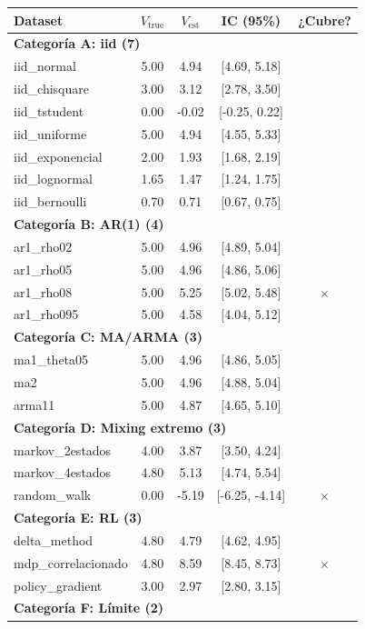 \documentclass[12pt,a4paper]{article}
\newcommand{\ok}{\textcolor{cbgreen}{\checkmark}}
\newcommand{\fail}{\textcolor{cbred}{$\times$}}
\begin{document}
\begin{longtable}{@{}lcccc@{}}
\toprule
Dataset & $V_{\text{true}}$ & $V_{\text{est}}$ & IC (95\%) & ¿Cubre? \\
\midrule
\endhead
\multicolumn{5}{l}{\textbf{Categoría A: iid (7)}} \\
iid\_normal & 5.00 & 4.94 & [4.69, 5.18] & \ok \\
iid\_chisquare & 3.00 & 3.12 & [2.78, 3.50] & \ok \\
iid\_tstudent & 0.00 & -0.02 & [-0.25, 0.22] & \ok \\
iid\_uniforme & 5.00 & 4.94 & [4.55, 5.33] & \ok \\
iid\_exponencial & 2.00 & 1.93 & [1.68, 2.19] & \ok \\
iid\_lognormal & 1.65 & 1.47 & [1.24, 1.75] & \ok \\
iid\_bernoulli & 0.70 & 0.71 & [0.67, 0.75] & \ok \\
\midrule
\multicolumn{5}{l}{\textbf{Categoría B: AR(1) (4)}} \\
ar1\_rho02 & 5.00 & 4.96 & [4.89, 5.04] & \ok \\
ar1\_rho05 & 5.00 & 4.96 & [4.86, 5.06] & \ok \\
ar1\_rho08 & 5.00 & 5.25 & [5.02, 5.48] & \fail \\
ar1\_rho095 & 5.00 & 4.58 & [4.04, 5.12] & \ok \\
\midrule
\multicolumn{5}{l}{\textbf{Categoría C: MA/ARMA (3)}} \\
ma1\_theta05 & 5.00 & 4.96 & [4.86, 5.05] & \ok \\
ma2 & 5.00 & 4.96 & [4.88, 5.04] & \ok \\
arma11 & 5.00 & 4.87 & [4.65, 5.10] & \ok \\
\midrule
\multicolumn{5}{l}{\textbf{Categoría D: Mixing extremo (3)}} \\
markov\_2estados & 4.00 & 3.87 & [3.50, 4.24] & \ok \\
markov\_4estados & 4.80 & 5.13 & [4.74, 5.54] & \ok \\
random\_walk & 0.00 & -5.19 & [-6.25, -4.14] & \fail \\
\midrule
\multicolumn{5}{l}{\textbf{Categoría E: RL (3)}} \\
delta\_method & 4.80 & 4.79 & [4.62, 4.95] & \ok \\
mdp\_correlacionado & 4.80 & 8.59 & [8.45, 8.73] & \fail \\
policy\_gradient & 3.00 & 2.97 & [2.80, 3.15] & \ok \\
\midrule
\multicolumn{5}{l}{\textbf{Categoría F: Límite (2)}} \\

\end{longtable}
\end{document}
